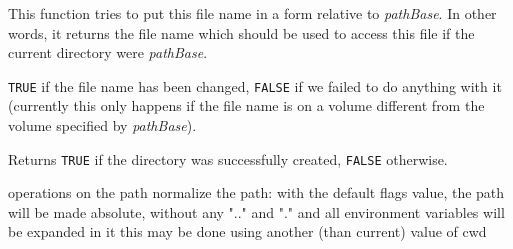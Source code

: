 
This function tries to put this file name in a form relative to {\it pathBase}.
In other words, it returns the file name which should be used to access this
file if the current directory were {\it pathBase}.




{\tt TRUE} if the file name has been changed, {\tt FALSE} if we failed to do
anything with it (currently this only happens if the file name is on a volume
different from the volume specified by {\it pathBase}).



\label{wxfilenamemkdir}







Returns {\tt TRUE} if the directory was successfully created, {\tt FALSE}
otherwise.

\label{wxfilenamenormalize}


operations on the path
normalize the path: with the default flags value, the path will be
made absolute, without any ".." and "." and all environment
variables will be expanded in it
this may be done using another (than current) value of cwd


